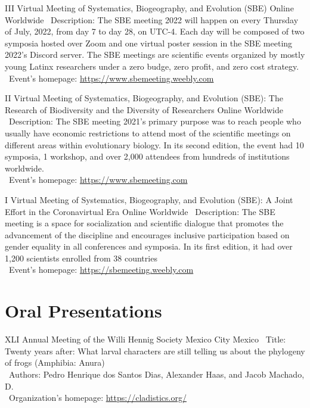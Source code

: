 \documentclass[11pt, letterpaper, sans]{moderncv}
\begin{document}
	{III Virtual Meeting of Systematics, Biogeography, and Evolution (SBE)}
	{Online}
	{Worldwide}
	{}
	{
		\textbullet~Description: The SBE meeting 2022 will happen on every Thursday of July, 2022, from day 7 to day 28, on UTC-4. Each day will be composed of two symposia hosted over Zoom and one virtual poster session in the SBE meeting 2022's Discord server. The SBE meetings are scientific events organized by mostly young Latinx researchers under a zero budge, zero profit, and zero cost strategy.\\
		\textbullet~Event's homepage: \url{https://www.sbemeeting.weebly.com}
	}

	{II Virtual Meeting of Systematics, Biogeography, and Evolution (SBE): The Research of Biodiversity and the Diversity of Researchers}
	{Online}
	{Worldwide}
	{}
	{
		\textbullet~Description: The SBE meeting 2021's primary purpose was to reach people who usually have economic restrictions to attend most of the scientific meetings on different areas within evolutionary biology. In its second edition, the event had 10 symposia, 1 workshop, and over 2,000 attendees from hundreds of institutions worldwide.\\
		\textbullet~Event's homepage: \url{https://www.sbemeeting.com}
	}

	{I Virtual Meeting of Systematics, Biogeography, and Evolution (SBE): A Joint Effort in the Coronavirtual Era}
	{Online}
	{Worldwide}
	{}
	{
		\textbullet~Description: The SBE meeting is a space for socialization and scientific dialogue that promotes the advancement of the discipline and encourages inclusive participation based on gender equality in all conferences and symposia. In its first edition, it had over 1,200 scientists enrolled from 38 countries\\
		\textbullet~Event's homepage: \url{https://sbemeeting.weebly.com}
	}


\section{Oral Presentations}

    {XLI Annual Meeting of the Willi Hennig Society}
    {Mexico City}
    {Mexico}
    {}
    {
        \textbullet~Title: Twenty years after: What larval characters are still telling us about the phylogeny of frogs (Amphibia: Anura)\\
        \textbullet~Authors: Pedro Henrique dos Santos Dias, Alexander Haas, and Jacob Machado, D.\\
        \textbullet~Organization's homepage: \url{https://cladistics.org/}
    }
\end{document}
